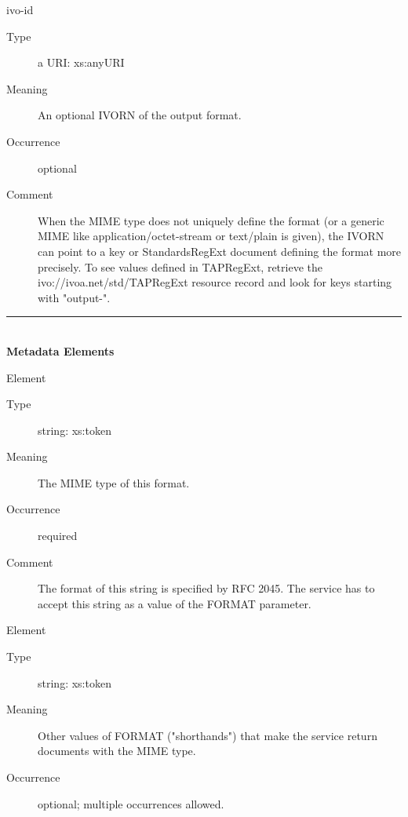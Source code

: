 \documentclass{ivoa}
\begin{document}
\begin{bigdescription}
\item[ivo-id]
\begin{description}
\item[Type\quad] a URI: xs:anyURI
\item[Meaning\quad] 
        An optional IVORN of the output format.
        
\item[Occurrence\quad] optional
\item[Comment\quad] 
        	When the MIME type does not uniquely define the
        	format (or a generic MIME like application/octet-stream or
        	text/plain is given), the IVORN can point to a key
        	or StandardsRegExt document defining the format more
        	precisely.  To see values defined in TAPRegExt,
					retrieve the ivo://ivoa.net/std/TAPRegExt
      		resource record and look for keys starting with "output-".
        
\end{description}


\end{bigdescription}



\noindent\rule[-2pt]{\textwidth}{0.5pt}\\
					\textbf{ Metadata Elements}

\begin{bigdescription}\item[Element \xmlel{mime}]
\begin{description}
\item[Type\quad] string: xs:token
\item[Meaning\quad] 
          The MIME type of this format.
          
\item[Occurrence\quad] required
\item[Comment\quad] 
          The format of this string is specified by RFC 2045.
          The service has to accept this string as a 
          value of the FORMAT parameter.
          

\end{description}
\item[Element \xmlel{alias}]
\begin{description}
\item[Type\quad] string: xs:token
\item[Meaning\quad] 
          Other values of FORMAT ("shorthands") that make the service return 
          documents with the MIME type.
          
\item[Occurrence\quad] optional; multiple occurrences allowed.

\end{description}


\end{bigdescription}
\end{document}
